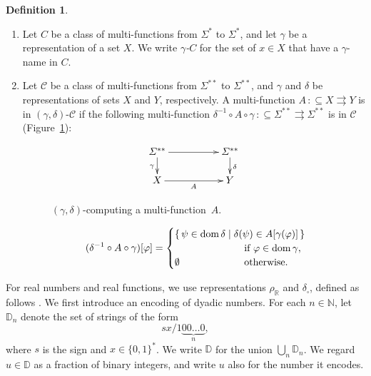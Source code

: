 \documentclass[conference]{IEEEtran}
\newcommand{\R}{\mathbb R}
\newcommand{\N}{\mathbb N}
\newcommand{\D}{\mathbb D}
\newcommand{\deltabox}{\delta _\square}
\newcommand{\rhoR}{\rho _\R}
\newcommand{\LM}{\varSigma ^{**}}
\newcommand{\dom}{\mathop{\rm dom}}
\theoremstyle{definition}
\newtheorem{definition}[theorem]{Definition}
\theoremstyle{remark}
\newcommand{\pcolon}{\mathpunct{\,:\subseteq}}
\begin{document}
\begin{definition}
\label{definition: computation wrt representation}
\begin{enumerate}
\item 
Let $C$ be a class of multi-functions from $\varSigma ^*$ to $\varSigma ^*$, 
and let $\gamma$ be a representation of a set $X$. 
We write \emph{$\gamma$-$C$} for the set of $x \in X$
that have a $\gamma$-name in $C$.
\item  \label{enumi: computing wrt representation}
Let $\mathcal C$ be a class of multi-functions from $\LM$ to $\LM$,
and $\gamma$ and $\delta$ be representations of sets $X$ and $Y$, respectively.
A multi-function $A \pcolon X \rightrightarrows Y$
is in $(\gamma, \delta)$-$\mathcal C$ if 
the following multi-function $
\delta^{-1} \circ A \circ \gamma \pcolon \LM \rightrightarrows \LM
$ is in $\mathcal C$ (Figure~\ref{figure: realization}): 
\begin{figure}[t]
\begin{equation*}
  \xymatrix@C=50pt@R=16pt{
   \LM \ar[r] \ar[d] _\gamma & \LM \ar[d] ^\delta  \\
   X \ar[r] _A & Y 
  }
\end{equation*}
 \caption{$(\gamma, \delta)$-computing a multi-function~$A$.}
 \label{figure: realization}
\end{figure}
\begin{equation}
 (\delta^{-1} \circ A \circ \gamma)[\varphi] = 
  \begin{cases}
   \rlap{$\{\, \psi \in \dom \delta \mid \delta(\psi) \in A[\gamma(\varphi)] \,\}$} \hspace*{6em}
   \\
   & 
   \text{if } \varphi \in \dom \gamma, 
   \\ 
   \emptyset 
   &
   \text{otherwise.}
  \end{cases}
\end{equation}
\end{enumerate}
\end{definition}

For real numbers and real functions,
we use representations $\rhoR$ and $\deltabox$, 
defined as follows \cite{kawamura2012complexity}. 
We first introduce an encoding of dyadic numbers.
For each $n \in \N$, let $\D_n$ denote the set of strings of the form
\begin{equation}
 sx/1\!\underbrace{00\dots0}_{n},
\end{equation}
where $s$ is the sign and $x \in \{0,1\}^*$.
We write $\D$ for the union $\bigcup _n \D _n$.
We regard $u \in \D$ as a fraction of binary integers, 
and write $u$ also for the number it encodes. 
\end{document}
